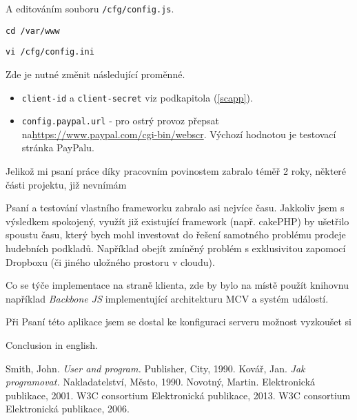 \documentclass[12pt]{article}
\begin{document}
A editováním souboru \texttt{/cfg/config.js}.

\texttt{cd /var/www}

\texttt{vi /cfg/config.ini}\newline

Zde je nutné změnit následující proměnné.

\begin{itemize}
\item{\texttt{client-id} a \texttt{client-secret}} viz podkapitola (\ref{scapp}).
\item{\texttt{config.paypal.url}} - pro ostrý provoz přepsat na\newline \url{https://www.paypal.com/cgi-bin/webscr}. Výchozí hodnotou je testovací stránka PayPalu.
\end{itemize}

\begin{conclusions-cz}

Jelikož mi psaní práce díky pracovním povinostem zabralo téměř 2 roky, některé části projektu, již nevnímám 

Psaní a testování vlastního frameworku zabralo asi nejvíce času. Jakkoliv jsem s výsledkem spokojený, využít již existující framework (např. cakePHP) by ušetřilo spoustu času, který bych mohl investovat do řešení samotného problému prodeje hudebních podkladů. Například obejít zmíněný problém s exklusivitou zapomocí Dropboxu (či jiného uložného prostoru v cloudu).

Co se týče implementace na straně klienta, zde by bylo na místě použít knihovnu například \emph{Backbone JS} implementující architekturu MCV a systém událostí.

Při Psaní této aplikace jsem se dostal ke konfiguraci serveru 
možnost vyzkoušet si 

\end{conclusions-cz}

\begin{conclusions-en}
  Conclusion in english.
\end{conclusions-en}


\newpage
\begin{thebibliography}{99}

 Smith, John. \emph{User and program.}
                Publisher, City, 1990.
 Kovář, Jan. \emph{Jak programovat.}
                Nakladatelství, Město, 1990.
 Novotný, Martin.
                Elektronická publikace, 2001.
 W3C consortium
                Elektronická publikace, 2013.
 W3C consortium
                Elektronická publikace, 2006.

\end{thebibliography}
\end{document}
